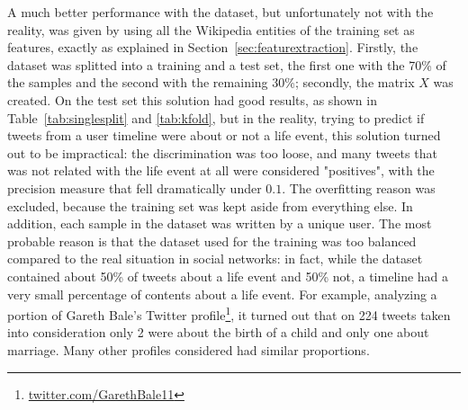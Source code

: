 \begin{table}[htbp]
\centering
{}\qquad\qquad
{}
\caption{The performance of the naive bayes were satisfactory on a very balanced dataset, but not with an unbalance situation. Unfortunatly, users' timelines are very unbalanced, and this classifier turned out to be inappropriate.}
\end{table}

A much better performance with the dataset, but unfortunately not with the reality, was given by using all the Wikipedia entities of the training set as features, exactly as explained in Section~\ref{sec:featurextraction}. Firstly, the dataset was splitted into a training and a test set, the first one with the 70\% of the samples and the second with the remaining 30\%; secondly, the matrix $X$ was created. On the test set this solution had good results, as shown in Table~\ref{tab:singlesplit} and \ref{tab:kfold}, but in the reality, trying to predict if tweets from a user timeline were about or not a life event, this solution turned out to be impractical: the discrimination was too loose, and many tweets that was not related with the life event at all were considered "positives", with the precision measure that fell dramatically under $0.1$. The overfitting reason was excluded, because the training set was kept aside from everything else. In addition, each sample in the dataset was written by a unique user. The most probable reason is that the dataset used for the training was too balanced compared to the real situation in social networks: in fact, while the dataset contained about 50\% of tweets about a life event and 50\% not, a timeline had a very small percentage of contents about a life event. For example, analyzing a portion of Gareth Bale's Twitter profile\footnote{\url{twitter.com/GarethBale11}}, it turned out that on 224 tweets taken into consideration only 2 were about the birth of a child and only one about marriage. Many other profiles considered had similar proportions.

